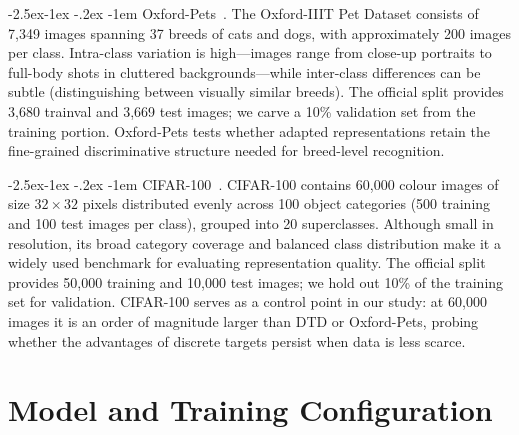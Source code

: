 \documentclass[runningheads]{llncs}
\makeatletter
\renewcommand\paragraph{\@startsection{paragraph}{4}{\z@}%
  {-2.5ex\@plus -1ex \@minus -.2ex}%
  {-1em}%
  {\normalfont\normalsize\bfseries}}
\makeatother
\begin{document}
\paragraph{Oxford-Pets~\cite{parkhi2012oxfordpets}.}
The Oxford-IIIT Pet Dataset consists of 7{,}349 images spanning 37 breeds of cats and dogs, with approximately 200 images per class.
Intra-class variation is high---images range from close-up portraits to full-body shots in cluttered backgrounds---while inter-class differences can be subtle (distinguishing between visually similar breeds).
The official split provides 3{,}680 trainval and 3{,}669 test images; we carve a 10\% validation set from the training portion.
Oxford-Pets tests whether adapted representations retain the fine-grained discriminative structure needed for breed-level recognition.

\paragraph{CIFAR-100~\cite{krizhevsky2009cifar}.}
CIFAR-100 contains 60{,}000 colour images of size $32 \times 32$ pixels distributed evenly across 100 object categories (500 training and 100 test images per class), grouped into 20 superclasses.
Although small in resolution, its broad category coverage and balanced class distribution make it a widely used benchmark for evaluating representation quality.
The official split provides 50{,}000 training and 10{,}000 test images; we hold out 10\% of the training set for validation.
CIFAR-100 serves as a control point in our study: at 60{,}000 images it is an order of magnitude larger than DTD or Oxford-Pets, probing whether the advantages of discrete targets persist when data is less scarce.

\section{Model and Training Configuration}
\label{sec:app_config}
\end{document}
